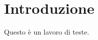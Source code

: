 \documentclass[italia]{article}
\begin{document}
\section{Introduzione}
Questo \`e un lavoro di teste.
\end{document}
